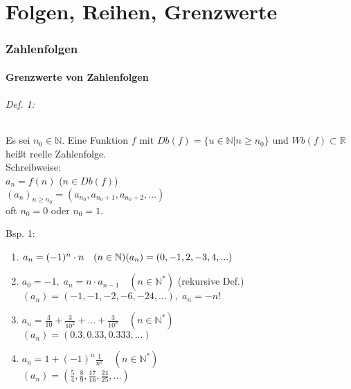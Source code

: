\newpage
\part{Folgen, Reihen, Grenzwerte}\partNumbering
\section{Zahlenfolgen}
\subsection{Grenzwerte von Zahlenfolgen}
\paragraph{Def. 1:} \parskp
Es sei $n_0 \in \mathbb{N}$. Eine Funktion $f$ mit $Db(f)=\{u\in \mathbb{N}|n\geq n_0\}$ und $Wb(f) \subset \mathbb{R}$ heißt reelle Zahlenfolge.\\
Schreibweise: \\
$a_n=f(n)$ \qquad ($n \in Db(f)$)\\
$\left(a_n\right)_{n\geq n_0}=\left(a_{n_0}, a_{n_0+1}, a_{n_0+2}, ...\right)$\\
oft $n_0=0$ oder $n_0=1$.
\subparagraph{Bsp. 1:} 
\begin{enumerate}[label=\alph*.)]
\item $a_n=(-1)^n\cdot n \quad (n \in \mathbb{N})\\
(a_n)=(0,-1,2,-3,4,...)$
\item $a_0=-1,\; a_n=n\cdot a_{n-1} \quad (n \in \mathbb{N}^*)$ \quad (rekursive Def.)\\
$(a_n)=(-1,-1,-2,-6,-24,...), \; a_n = -n!$
\item $a_n=\frac{3}{10}+\frac{3}{10^2}+...+\frac{3}{10^n} \quad (n\in \mathbb{N}^*)$\\
$(a_n)=(0.3, 0.33, 0.333, ... )$
\item $a_n=1+(-1)^n\frac{1}{n^2} \quad (n \in \mathbb{N}^*)$\\
$(a_n)=\left( \frac{5}{4}, \frac{8}{9}, \frac{17}{16}, \frac{24}{25},...\right)$
\end{enumerate}
